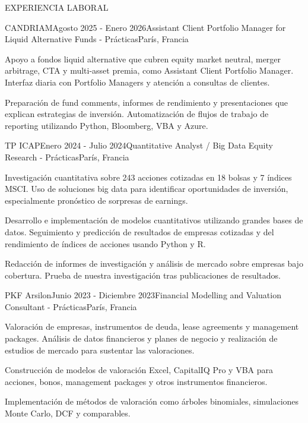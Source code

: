 \documentclass{resume} %
\begin{document}
\begin{rSection}{EXPERIENCIA LABORAL}

    \begin{rSubsection}{CANDRIAM}{Agosto 2025 - Enero 2026}{Assistant Client Portfolio Manager for Liquid Alternative Funds - Prácticas}{París, Francia}
        \item Apoyo a fondos liquid alternative que cubren equity market neutral, merger arbitrage, CTA y multi-asset premia, como Assistant Client Portfolio Manager. Interfaz diaria con Portfolio Managers y atención a consultas de clientes.
        \item Preparación de fund comments, informes de rendimiento y presentaciones que explican estrategias de inversión. Automatización de flujos de trabajo de reporting utilizando Python, Bloomberg, VBA y Azure.
    \end{rSubsection}

    \begin{rSubsection}{TP ICAP}{Enero 2024 - Julio 2024}{Quantitative Analyst / Big Data Equity Research - Prácticas}{París, Francia}
        \item Investigación cuantitativa sobre 243 acciones cotizadas en 18 bolsas y 7 índices MSCI. Uso de soluciones big data para identificar oportunidades de inversión, especialmente pronóstico de sorpresas de earnings.
        \item Desarrollo e implementación de modelos cuantitativos utilizando grandes bases de datos. Seguimiento y predicción de resultados de empresas cotizadas y del rendimiento de índices de acciones usando Python y R.
        \item Redacción de informes de investigación y análisis de mercado sobre empresas bajo cobertura. Prueba de nuestra investigación tras publicaciones de resultados.
    \end{rSubsection}

    \begin{rSubsection}{PKF Arsilon}{Junio 2023 - Diciembre 2023}{Financial Modelling and Valuation Consultant - Prácticas}{París, Francia}
        \item Valoración de empresas, instrumentos de deuda, lease agreements y management packages. Análisis de datos financieros y planes de negocio y realización de estudios de mercado para sustentar las valoraciones.
        \item Construcción de modelos de valoración Excel, CapitalIQ Pro y VBA para acciones, bonos, management packages y otros instrumentos financieros.
        \item Implementación de métodos de valoración como árboles binomiales, simulaciones Monte Carlo, DCF y comparables.
    \end{rSubsection}


\end{rSection}
\end{document}
